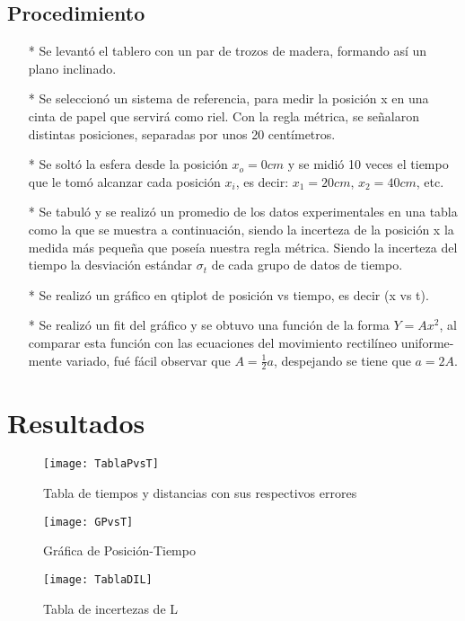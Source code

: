 \documentclass[osajnl,twocolumn,showpacs,superscriptaddress,10pt]{revtex4-1}
\begin{document}
\subsection{Procedimiento}
\begin{enumerate}
\item[*] Se levantó el tablero con un par de trozos de madera, formando así un plano inclinado.
\item[*] Se seleccionó un sistema de referencia, para medir la posición x en una cinta de papel que servirá como riel. Con la regla métrica, se señalaron distintas posiciones, separadas por unos 20 centímetros.
\item[*] Se soltó la esfera desde la posición $x_o = 0 cm $ y se midió 10 veces el tiempo que le tomó alcanzar cada posición $x_i$, es decir: $x_1 = 20 cm$, $x_2 = 40 cm$, etc.
\item[*] Se tabuló y se realizó un promedio de los datos experimentales en una tabla como la que se muestra a continuación, siendo la incerteza de la posición x la medida más pequeña que poseía nuestra regla métrica. Siendo la incerteza del tiempo la desviación estándar $\sigma_t$ de cada grupo de datos de tiempo.
\item[*] Se realizó un gráfico en qtiplot de posición vs tiempo, es decir (x vs t).
\item[*] Se realizó un fit del gráfico y se obtuvo una función de la forma $Y = Ax^2$, al comparar esta función con las ecuaciones del movimiento rectilíneo uniforme-mente variado, fué fácil observar que $ A = \frac{1}{2}a $, despejando se tiene que $ a = 2A$.
\end{enumerate}

\section{Resultados}
\begin{figure}[H]
	\centering
	\caption{Tabla de tiempos y distancias con sus respectivos errores}
	\texttt{[image: TablaPvsT]}
\end{figure}

\begin{figure}[H]
	\centering
	\caption{Gráfica de Posición-Tiempo}
	\texttt{[image: GPvsT]}
\end{figure}

\begin{figure}[H]
	\centering
	\caption{Tabla de incertezas de L}
	\texttt{[image: TablaDIL]}
\end{figure}
\end{document}
